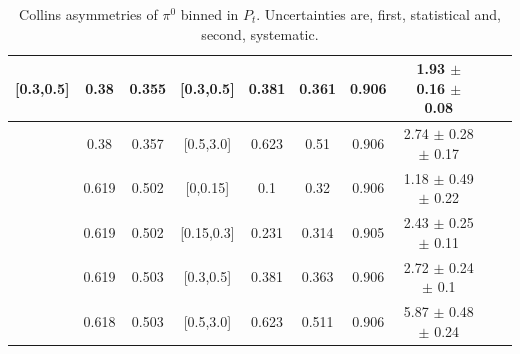 \begin{table}[H]
\begin{tabular}{|c| c| c| c| c| c| c| c| c| c|}
[0.3,0.5]	&	0.38	        &	0.355	&	[0.3,0.5]	&	0.381	&	0.361	&	0.906	&1.93  $\pm$ 0.16  $\pm$ 0.08  		\\ \hline
[0.3,0.5]	&	0.38	        &	0.357	&	[0.5,3.0]	&	0.623	&	0.51	 &       0.906   &     2.74  $\pm$ 0.28  $\pm$ 0.17  			\\ \hline
\hline
[0.5,3.0]	&	0.619	&	0.502	&	[0,0.15]	&	0.1	        &	0.32	  &    0.906          &1.18  $\pm$ 0.49  $\pm$ 0.22  	\\ \hline
[0.5,3.0]	&	0.619	&	0.502	&	[0.15,0.3]	&	0.231	&	0.314	&	0.905    	&2.43  $\pm$ 0.25  $\pm$ 0.11  	\\ \hline
[0.5,3.0]	&	0.619	&	0.503	&	[0.3,0.5]	&	0.381	&	0.363	&	0.906    	&2.72  $\pm$ 0.24  $\pm$ 0.1   	\\ \hline
[0.5,3.0]	&	0.618	&	0.503	&	[0.5,3.0]	&	0.623	&	0.511	&	0.906   	&5.87  $\pm$ 0.48  $\pm$ 0.24  	\\ \hline
\end{tabular}
\caption[Collins asymmetries of $\pi^0$ binned in $P_t$]{Collins asymmetries of $\pi^0$ binned in $P_t$. Uncertainties are, first, statistical and, second, systematic.}
\label{tab:finalpi0ptbin}
\end{table}

